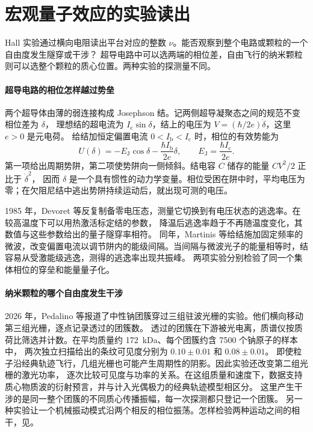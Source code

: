 \section{宏观量子效应的实验读出}
\label{sec:qm-macroscopic}
Hall 实验通过横向电阻读出平台对应的整数 $\nu$。能否观察到整个电路或颗粒的一个自由度发生隧穿或干涉？
超导电路中可以选两端的相位差，自由飞行的纳米颗粒则可以选整个颗粒的质心位置。两种实验的探测量不同。

\paragraph{超导电路的相位怎样越过势垒}
两个超导体由薄的弱连接构成 Josephson 结。记两侧超导凝聚态之间的规范不变相位差为 $\delta$，
理想结的超电流为 $I_{\mathrm c}\sin\delta$，结上的电压为 $V = (\hbar/2e)\dot\delta$，这里 $e > 0$ 是元电荷。
给结加恒定偏置电流 $0 < I_{\mathrm b} < I_{\mathrm c}$ 时，相位的有效势能为
\begin{equation}\label{eq:qm-junction-tilt}
    U(\delta) = -E_{\mathrm J}\cos\delta - \frac{\hbar I_{\mathrm b}}{2e}\delta,
    \qquad E_{\mathrm J} = \frac{\hbar I_{\mathrm c}}{2e}.
\end{equation}
第一项给出周期势阱，第二项使势阱向一侧倾斜。结电容 $C$ 储存的能量 $CV^2/2$ 正比于 $\dot\delta^2$，
因而 $\delta$ 是一个具有惯性的动力学变量。相位受困在阱中时，平均电压为零；在欠阻尼结中逃出势阱持续运动后，就出现可测的电压。

1985 年，\label{exp:qm-junction-escape}Devoret 等反复制备零电压态，测量它切换到有电压状态的逃逸率。在较高温度下可以用热激活标定结的参数，
降温后逃逸率趋于不再随温度变化，其数值与这些参数给出的量子隧穿率相符。
同年，\label{exp:qm-junction-levels}Martinis 等给结施加固定频率的微波，改变偏置电流以调节阱内的能级间隔。当间隔与微波光子的能量相等时，结容易从受激能级逃逸，测得的逃逸率出现共振峰。
两项实验分别检验了同一个集体相位的穿垒和能量量子化\cite{junction-escape,junction-levels}。

\paragraph{纳米颗粒的哪个自由度发生干涉}
2026 年，\label{exp:qm-cluster-interference}Pedalino 等报道了中性钠团簇穿过三组驻波光栅的实验。他们横向移动第三组光栅，逐点记录透过的团簇数。
透过的团簇在下游被光电离，质谱仪按质荷比筛选并计数。在平均质量约 \qty{172}{\kilo\dalton}、每个团簇约含 7500 个钠原子的样本中，
两次独立扫描给出的条纹可见度分别为 $0.10 \pm 0.01$ 和 $0.08 \pm 0.01$\cite{cluster-interference}。
即使粒子沿经典轨迹飞行，几组光栅也可能产生周期性的阴影。因此实验还改变第二组光栅的激光功率，
逐次比较可见度与功率的关系。在这组质量和速度下，数据支持质心物质波的衍射预言，并与计入光偶极力的经典轨迹模型相区分。
这里产生干涉的是同一整个团簇的不同质心传播振幅，每一次探测都只登记一个团簇。
另一种实验让一个机械振动模式沿两个相反的相位振荡。怎样检验两种运动之间的相干，见。

